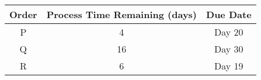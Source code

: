 \begin{center}
\begin{tabular}{|c|c|c|}
\hline
\textbf{Order} & \textbf{Process Time Remaining (days)} & \textbf{Due Date} \\
\hline
P & 4 & Day 20 \\
Q & 16 & Day 30 \\
R & 6 & Day 19 \\
\hline
\end{tabular}
\end{center}